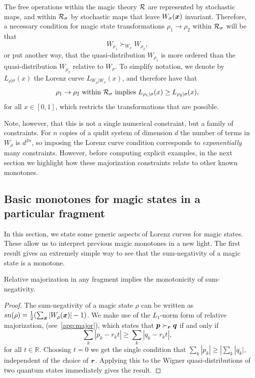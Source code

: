 \documentclass[pra,
aps,
twocolumn,
superscriptaddress,
groupedaddress,
nofootinbib,
reprint
]{revtex4-1}
\begin{document}
The free operations within the magic theory ${\mathcal R}$ are represented by stochastic maps, and within ${\mathcal R}_\sigma$ by stochastic maps that leave $W_\sigma(\boldsymbol{x})$ invariant. Therefore, a necessary condition for magic state transformations $\rho_1 \rightarrow \rho_2$ within ${\mathcal R}_\sigma$ will be that 
\begin{equation}
	W_{\rho_1} \succ_{W_{\sigma}} W_{\rho_2},
\end{equation}
or put another way, that the quasi-distribution $W_{\rho_1}$ is more ordered than the quasi-distribution $W_{\rho_2}$ relative to $W_\sigma$. To simplify notation, we denote by $L_{\rho | \sigma}(x)$ the Lorenz curve $L_{W_{\rho} | W_{\sigma}} (x)$, and therefore have that
\begin{equation}
\rho_1 \rightarrow \rho_2 \mbox{ within }{\mathcal R}_\sigma \mbox{ implies } L_{\rho_1 |\sigma} (x) \ge L_{\rho_2 |\sigma} (x),
\end{equation}
for all $x \in [0,1]$, which restricts the transformations that are possible.

  Note, however, that this is not a single numerical constraint, but a family of constraints. For $n$ copies of a qudit system of dimension $d$ the number of terms in $W_{\rho}$ is $d^{2n}$, so imposing the Lorenz curve condition corresponds to \emph{exponentially} many constraints. However,  before computing explicit examples, in the next section we highlight how these majorization constraints relate to other known monotones.

\subsection{Basic monotones for magic states in a particular fragment}
\label{sec:monotones_frag}

In this section, we state some generic aspects of Lorenz curves for magic states. These allow us to interpret previous magic monotones in a new light. The first result gives an extremely simple way to see that the sum-negativity of a magic state is a monotone.

\begin{lemma} Relative majorization in any fragment implies the monotonicity of sum-negativity. 
\end{lemma}
\begin{proof}
	The sum-negativity of a magic state $\rho$ can be written as $sn(\rho) =\frac{1}{2} (\sum_{\boldsymbol{x}} |W_\rho(\boldsymbol{x}) | - 1)$.
We make use of the $L_1$-norm form of relative majorization, (see~\cref{app:major}), which states that $\boldsymbol{p} \succ_{\boldsymbol{r}} \boldsymbol{q}$ if and only if
	\begin{equation}
\sum_k | p_k - r_k t | \geq \sum_k | q_k - r_k t |,
\end{equation}
for all $t\in \mathbb{R}$. Choosing $t=0$ we get the single condition that $\sum_k |p_k| \ge |\sum_k |q_k|$, independent of the choice of $\boldsymbol{r}$. Applying this to the Wigner quasi-distributions of two quantum states immediately gives the result.
\end{proof}
\end{document}
